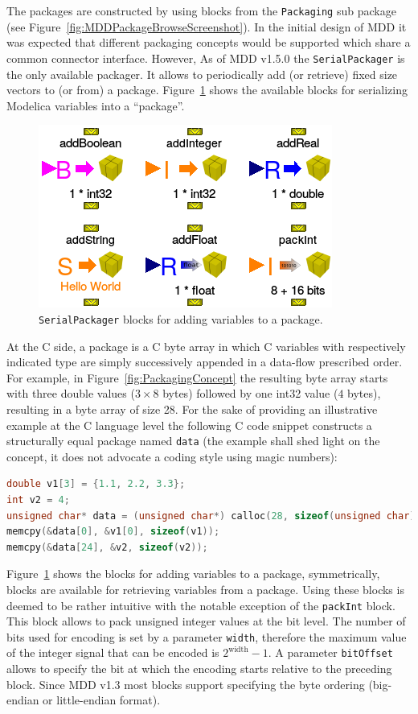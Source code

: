 \documentclass{resources/modelica}
\newcommand{\clang}[1]{\lstinline[language=c]|#1|}
\newcommand{\modelica}[1]{\lstinline[language=modelica]|#1|}
\begin{document}
The packages are constructed by using blocks from the \modelica{Packaging}
sub package (see Figure~\ref{fig:MDDPackageBrowseScreenshot}). In the initial
design of MDD it was expected that different packaging concepts would be
supported which share a common connector interface. However, As of MDD v1.5.0
the \modelica{SerialPackager} is the only available packager. It allows
to periodically add (or retrieve) fixed size vectors to (or from) a package.
Figure~\ref{fig:SerialPackagerBlocks} shows the available blocks for serializing
Modelica variables into a ``package''.
\begin{figure}[htb]
  \centering
  \includegraphics[width=0.6\columnwidth]{figures/SerialPackagerBlocks}
  \caption{\modelica{SerialPackager} blocks for adding variables to a package.}
  \label{fig:SerialPackagerBlocks}
\end{figure}

At the C side, a package is a C byte array in which C variables with
respectively indicated type are simply successively appended in a data-flow
prescribed order. For example, in Figure~\ref{fig:PackagingConcept} the
resulting byte array starts with three double values ($3 \times 8$ bytes)
followed by one int32 value ($4$ bytes), resulting in a byte array of size 28.
For the sake of providing an illustrative example at the C language level
the following C code snippet constructs a structurally equal package named
\clang{data} (the example shall shed light on the concept, it does not
advocate a coding style using magic numbers):
\begin{lstlisting}[language=C]
double v1[3] = {1.1, 2.2, 3.3};
int v2 = 4;
unsigned char* data = (unsigned char*) calloc(28, sizeof(unsigned char));
memcpy(&data[0], &v1[0], sizeof(v1));
memcpy(&data[24], &v2, sizeof(v2));
\end{lstlisting}

Figure~\ref{fig:SerialPackagerBlocks} shows the blocks for adding
variables to a package, symmetrically, blocks are available for retrieving variables from a
package. Using these blocks is deemed to be rather
intuitive with the notable exception of the \modelica{packInt} block. This
block allows to pack unsigned integer values at the bit level. The number of
bits used for encoding is set by a parameter \modelica{width}, therefore the maximum value
of the integer signal that can be encoded is $2^{\mathrm{width}} - 1$. A
parameter \modelica{bitOffset} allows to specify the bit at which the encoding starts
relative to the preceding block. Since MDD v1.3 most blocks support specifying
the byte ordering (big-endian or little-endian format).
\end{document}
